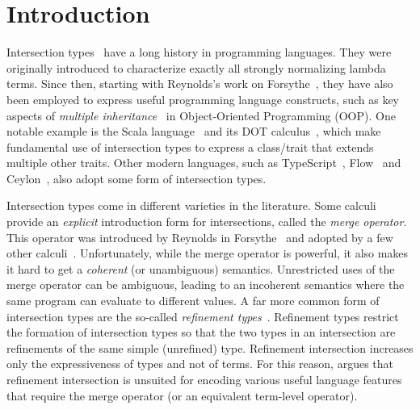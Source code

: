 
\section{Introduction}
\label{sec:intro}

Intersection types~\citep{pottinger1980type,coppo1981functional} have a long
history in programming languages. They were originally introduced to
characterize exactly all strongly normalizing lambda terms. Since then,
starting with Reynolds's work on
Forsythe~\citep{reynolds1988preliminary}, they have also been employed
to express useful programming language constructs, such as key
aspects of \emph{multiple inheritance}~\citep{compagnoni1996higher} in
Object-Oriented Programming (OOP). One notable
example is the Scala
language~\citep{odersky2004overview} and its DOT
calculus~\citep{amin2012dependent}, which make fundamental use of intersection
types to express a class/trait that extends multiple other traits. Other
modern languages, such as TypeScript~\citep{typescript}, Flow~\citep{flow} and
Ceylon~\citep{ceylon}, also adopt some form of intersection types.

Intersection types come in different varieties in the literature. Some calculi
provide an \emph{explicit} introduction form for intersections, called the
\emph{merge operator}. This operator was introduced by Reynolds in Forsythe~\citep{reynolds1988preliminary} and
adopted by a few other calculi~\citep{Castagna_1992,
  dunfield2014elaborating, oliveira2016disjoint, alpuimdisjoint}. Unfortunately,
while the merge operator is powerful, it also makes it hard to get a \emph{coherent}
(or unambiguous) semantics. 
Unrestricted uses of the merge operator can be ambiguous, leading to an incoherent semantics
where the same program can evaluate to different values. 
A far more common form of intersection types are the so-called \emph{refinement
  types}~\citep{Freeman_1991, Davies_2000, dunfield2003type}. Refinement types
restrict the formation of intersection types so that the two types in an
intersection are refinements of the same simple (unrefined) type. Refinement
intersection increases only the expressiveness of types and not of terms. 
For this reason, \citet{dunfield2014elaborating} argues that refinement
intersection is unsuited for encoding various useful language features
that require the merge operator (or an equivalent term-level operator).


